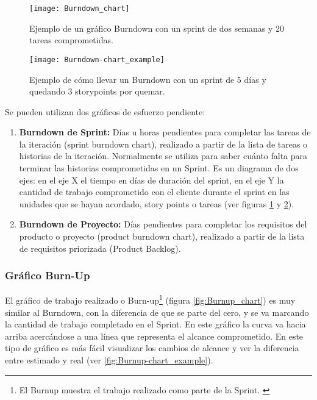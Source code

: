 \begin{figure}[h]
  \centering
  \texttt{[image: Burndown\_chart]}
  \caption{Ejemplo de un gráfico Burndown con un sprint de dos semanas y 20 tareas comprometidas.}
  \centering
  \label{fig:Burndown_chart} %
\end{figure}

\begin{figure}[h]
  \centering
  \texttt{[image: Burndown-chart\_example]}
  \caption{Ejemplo de cómo llevar un Burndown con un sprint de 5 días y quedando 3 storypoints por quemar.}
  \centering
  \label{fig:Burndown-chart_example} %
\end{figure}

Se pueden utilizan dos gráficos de esfuerzo pendiente:

\begin{enumerate}

\item \textbf{Burndown de Sprint:} Días u horas pendientes para completar las tareas de la iteración (sprint burndown chart), realizado a partir de la lista de tareas o historias de la iteración. Normalmente se utiliza para saber cuánto falta para terminar las historias comprometidas en un Sprint. Es un diagrama de dos ejes: en el eje X el tiempo en días de duración del sprint, en el eje Y la cantidad de trabajo comprometido con el cliente durante el sprint en las unidades que se hayan acordado, story points o tareas (ver figuras \ref{fig:Burndown_chart} y \ref{fig:Burndown-chart_example}).

\item \textbf{Burndown de Proyecto:} Días pendientes para completar los requisitos del producto o proyecto (product burndown chart), realizado a partir de la lista de requisitos priorizada (Product Backlog).

\end{enumerate}

\subsubsection{Gráfico Burn-Up}

El gráfico de trabajo realizado o Burn-up\footnote{El Burnup muestra el trabajo realizado como parte de la Sprint. \cite{SBOK-2013}} (figura \ref{fig:Burnup_chart}) es muy similar al Burndown, con la diferencia de que se parte del cero, y se va marcando la cantidad de trabajo completado en el Sprint. En este gráfico la curva va hacia arriba acercándose a una línea que representa el alcance comprometido. En este tipo de gráfico es más fácil visualizar los cambios de alcance y ver la diferencia entre estimado y real (ver \ref{fig:Burnup-chart_example}).

